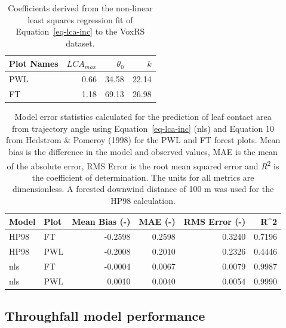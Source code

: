\documentclass[
  letterpaper,
  DIV=11,
  numbers=noendperiod]{scrartcl}
\begin{document}
\begin{longtable}[]{@{}lrrr@{}}

\caption{\label{tbl-lca-coefs}Coefficients derived from the non-linear
least squares regression fit of Equation~\ref{eq-lca-inc} to the VoxRS
dataset.}

\tabularnewline

\toprule\noalign{}
Plot Names & \(LCA_{max}\) & \(\theta_0\) & \(k\) \\
\midrule\noalign{}
\endhead
\bottomrule\noalign{}
\endlastfoot
PWL & 0.66 & 34.58 & 22.14 \\
FT & 1.18 & 69.13 & 26.98 \\

\end{longtable}

\begin{longtable}[]{@{}llrrrr@{}}

\caption{\label{tbl-lca-mod-err}Model error statistics calculated for
the prediction of leaf contact area from trajectory angle using
Equation~\ref{eq-lca-inc} (nls) and Equation 10 from Hedstrom \& Pomeroy
(1998) for the PWL and FT forest plots. Mean bias is the difference in
the model and observed values, MAE is the mean of the absolute error,
RMS Error is the root mean squared error and \emph{R}\textsuperscript{2}
is the coefficient of determination. The units for all metrics are
dimensionless. A forested downwind distance of 100 m was used for the
HP98 calculation.}

\tabularnewline

\toprule\noalign{}
Model & Plot & Mean Bias (-) & MAE (-) & RMS Error (-) & R\^{}2 \\
\midrule\noalign{}
\endhead
\bottomrule\noalign{}
\endlastfoot
HP98 & FT & -0.2598 & 0.2598 & 0.3240 & 0.7196 \\
HP98 & PWL & -0.2008 & 0.2010 & 0.2326 & 0.4446 \\
nls & FT & -0.0004 & 0.0067 & 0.0079 & 0.9987 \\
nls & PWL & 0.0010 & 0.0040 & 0.0054 & 0.9990 \\

\end{longtable}

\subsection{Throughfall model
performance}\label{throughfall-model-performance}
\end{document}
